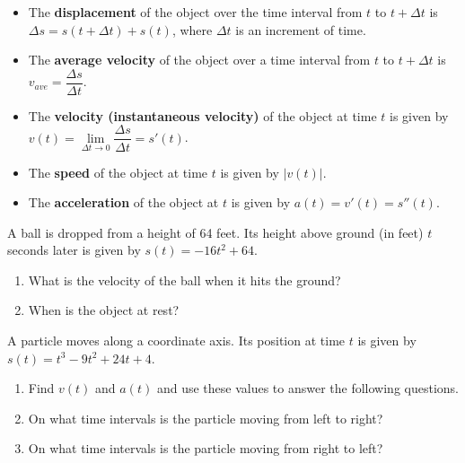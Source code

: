 \begin{itemize}
\item
  The \textbf{displacement} of the object over the time interval from
  \(t\) to \(t+\Delta t\) is \(\Delta s=s(t+\Delta t)+s(t)\), where
  \(\Delta t\) is an increment of time.
\item
  The \textbf{average velocity} of the object over a time interval from
  \(t\) to \(t+\Delta t\) is \(v_{ave}=\dfrac{\Delta s}{\Delta t}\).
\item
  The \textbf{velocity (instantaneous velocity)} of the object at time
  \(t\) is given by
  \(v(t)=\lim\limits_{\Delta t\to 0}\dfrac{\Delta s}{\Delta t}=s'(t)\).
\item
  The \textbf{speed} of the object at time \(t\) is given by \(|v(t)|\).
\item
  The \textbf{acceleration} of the object at \(t\) is given by
  \(a(t)=v'(t)=s''(t)\).
\end{itemize}

\begin{example}

A ball is dropped from a height of 64 feet. Its height above ground (in
feet) \(t\) seconds later is given by \(s(t)=-16t^2+64\).

\begin{enumerate}
\item
  What is the velocity of the ball when it hits the ground?
\item
  When is the object at rest?
\end{enumerate}

\end{example}

\begin{example}

A particle moves along a coordinate axis. Its position at time \(t\) is given by
\(s(t)=t^3-9t^2+24t+4\).

\begin{enumerate}
\item
  Find \(v(t)\) and \(a(t)\) and use these values to answer the
  following questions.
\item
  On what time intervals is the particle moving from left to right?
\item
  On what time intervals is the particle moving from right to left?
\end{enumerate}

\end{example}


